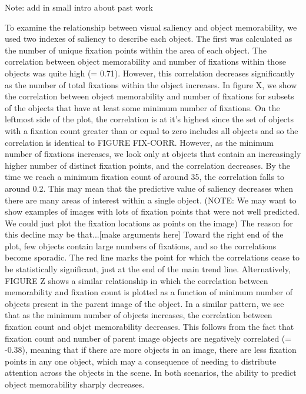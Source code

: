 Note: add in small intro about past work

To examine the relationship between visual saliency and object memorability, we used two indexes of saliency to describe each object. The first was calculated as the number of unique fixation points within the area of each object. The correlation between object memorability and number of fixations within those objects was quite high (\rho = 0.71). However, this correlation decreases significantly as the number of total fixations within the object increases. In figure X, we show the correlation between object memorability and number of fixations for subsets of the objects that have at least some minimum number of fixations. On the leftmost side of the plot, the correlation is at it's highest since the set of objects with a fixation count greater than or equal to zero includes all objects and so the correlation is identical to FIGURE FIX-CORR. However, as the minimum number of fixations increases, we look only at objects that contain an increasingly higher number of distinct fixation points, and the correlation decreases. By the time we reach a minimum fixation count of around 35, the correlation falls to around 0.2. This may mean that the predictive value of saliency decreases when there are many areas of interest within a single object. (NOTE: We may want to show examples of images with lots of fixation points that were not well predicted. We could just plot the fixation locations as points on the image) The reason for this decline may be that...[make arguments here] Toward the right end of the plot, few objects contain large numbers of fixations, and so the correlations become sporadic. The red line marks the point for which the correlations cease to be statistically significant, just at the end of the main trend line. Alternatively, FIGURE Z shows a similar relationship in which the correlation between memorability and fixation count is plotted as a function of minimum number of objects present in the parent image of the object. In a similar pattern, we see that as the minimum number of objects increases, the correlation between fixation count and objet memorability decreases. This follows from the fact that fixation count and number of parent image objects are negatively correlated (\rho = -0.38), meaning that if there are more objects in an image, there are less fixation points in any one object, which may a consequence of needing to distribute attention across the objects in the scene. In both scenarios, the ability to predict object memorability sharply decreases.

